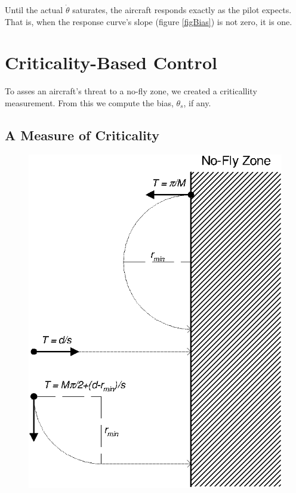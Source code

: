 \documentclass[11pt]{article}
\begin{document}
Until the actual $\dot{\theta}$ saturates, the aircraft responds
exactly as the pilot expects.  That is, when the response curve's slope (figure
\ref{figBias}) is not zero, it is one.


\section{Criticality-Based Control}

To asses an aircraft's threat to a no-fly zone, we created a
criticallity measurement.  From this we compute the bias, $\theta_s$,
if any.


\subsection{A Measure of Criticality}

\begin{figure}[btp]
\centering
\includegraphics{criticality.eps}
\end{figure}
\end{document}

